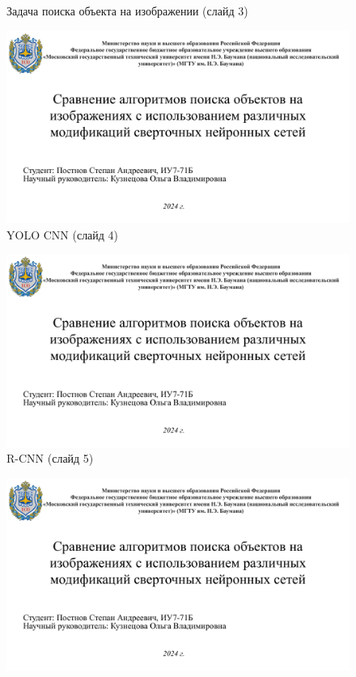 \begin{appendices}
\begin{figure}[h]
		\caption{Задача поиска объекта на изображении (слайд 3)}
	\end{figure}
	\begin{figure}[h]
		\centering
		\includegraphics[height=0.5\textheight, page=4, angle=90]{inc/img/pres.pdf}
		\caption{YOLO CNN (слайд 4)}
	\end{figure}
	\begin{figure}[h]
		\centering
		\includegraphics[height=0.5\textheight, page=5, angle=90]{inc/img/pres.pdf}
		\caption{R-CNN (слайд 5)}
	\end{figure}
	\begin{figure}[h]
		\centering
		\includegraphics[height=0.5\textheight, page=6, angle=90]{inc/img/pres.pdf}

\end{figure}
\end{appendices}
